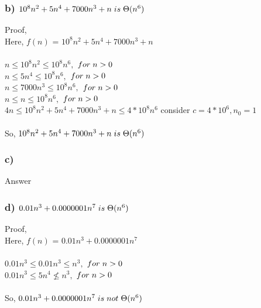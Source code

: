 \documentclass[10pt, a4paper]{article}
\begin{document}
	\subsubsection*{b)
	$10^8n^2+5n^4+7000n^3+n\hspace{0.1cm} is\hspace{0.1cm} \Theta(n^6)$}
	{Proof,\\}
	Here, {$f(n)$} = {$10^8n^2+5n^4+7000n^3+n$} \\\\
	{$ n \leq 10^8n^2 \leq 10^8n^6 , $ \hspace{.5cm}$ for\hspace{0.1cm}n>0$\\}
	{$ n \leq 5n^4 \leq 10^8n^6, $ \hspace{.5cm}$ for\hspace{0.1cm}n>0$\\}
	{$ n \leq 7000n^3 \leq 10^8n^6, $ \hspace{.5cm}$ for\hspace{0.1cm}n>0$\\}
	{$ n \leq n \leq 10^8n^6, $ \hspace{.5cm}$ for\hspace{0.1cm}n>0$\\}
	{$4n \leq 10^8n^2+5n^4+7000n^3+n  \leq 4*10^8n^6$ \rightarrow consider \hspace{.1cm} $c=4 * 10^6, n_0=1$ \\ \\}
	{So,\hspace{0.1cm} $10^8n^2+5n^4+7000n^3+n\hspace{0.1cm} is\hspace{0.1cm} \Theta(n^6)$}
	
	\subsubsection*{c)}
	Answer
	\subsubsection*{d) $0.01n^3+0.0000001n^7\hspace{0.1cm} is\hspace{0.1cm} \Theta(n^6)$}
	{Proof,\\}
	Here, {$f(n)$} = {$0.01n^3+0.0000001n^7$} \\\\
	{$ 0.01n^3 \leq 0.01n^3 \leq n^3 , $ \hspace{.5cm}$ for\hspace{0.1cm}n>0$\\}
	{$ 0.01n^3 \leq 5n^4 \nleq n^3, $ \hspace{.5cm}$ for\hspace{0.1cm}n>0$\\}
	\\
	{So,\hspace{0.1cm} $0.01n^3+0.0000001n^7\hspace{0.1cm} is\hspace{0.1cm} not \hspace{0.1cm} \Theta(n^6)$}
	
\end{document}
